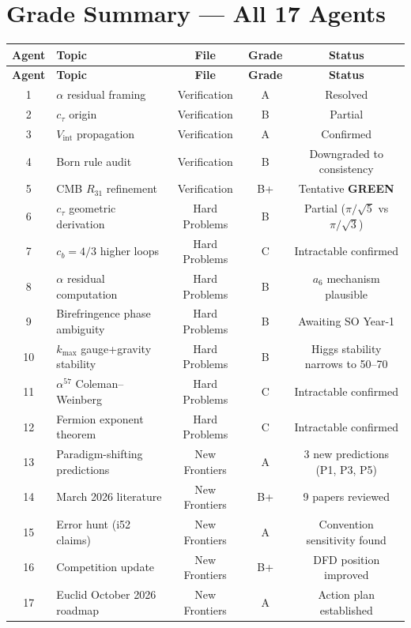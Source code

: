 \documentclass[11pt,a4paper]{article}
\newcommand{\GREEN}{\textcolor{dfdgreen}{\textbf{GREEN}}}
\begin{document}
\section{Grade Summary --- All 17 Agents}
\label{sec:grades}

\begin{center}
\begin{longtable}{clccc}
\toprule
\textbf{Agent} & \textbf{Topic} & \textbf{File} & \textbf{Grade} & \textbf{Status} \\
\midrule
\endfirsthead
\toprule
\textbf{Agent} & \textbf{Topic} & \textbf{File} & \textbf{Grade} & \textbf{Status} \\
\midrule
\endhead
1 & $\alpha$ residual framing & Verification & A & Resolved \\
2 & $c_\tau$ origin & Verification & B & Partial \\
3 & $V_{\mathrm{int}}$ propagation & Verification & A & Confirmed \\
4 & Born rule audit & Verification & B & Downgraded to consistency \\
5 & CMB $R_{31}$ refinement & Verification & B+ & Tentative \GREEN \\
\midrule
6 & $c_\tau$ geometric derivation & Hard Problems & B & Partial ($\pi/\sqrt{5}$ vs $\pi/\sqrt{3}$) \\
7 & $c_b = 4/3$ higher loops & Hard Problems & C & Intractable confirmed \\
8 & $\alpha$ residual computation & Hard Problems & B & $a_6$ mechanism plausible \\
9 & Birefringence phase ambiguity & Hard Problems & B & Awaiting SO Year-1 \\
10 & $k_{\max}$ gauge+gravity stability & Hard Problems & B & Higgs stability narrows to 50--70 \\
11 & $\alpha^{57}$ Coleman--Weinberg & Hard Problems & C & Intractable confirmed \\
12 & Fermion exponent theorem & Hard Problems & C & Intractable confirmed \\
\midrule
13 & Paradigm-shifting predictions & New Frontiers & A & 3 new predictions (P1, P3, P5) \\
14 & March 2026 literature & New Frontiers & B+ & 9 papers reviewed \\
15 & Error hunt (i52 claims) & New Frontiers & A & Convention sensitivity found \\
16 & Competition update & New Frontiers & B+ & DFD position improved \\
17 & Euclid October 2026 roadmap & New Frontiers & A & Action plan established \\
\bottomrule
\end{longtable}
\end{center}
\end{document}
